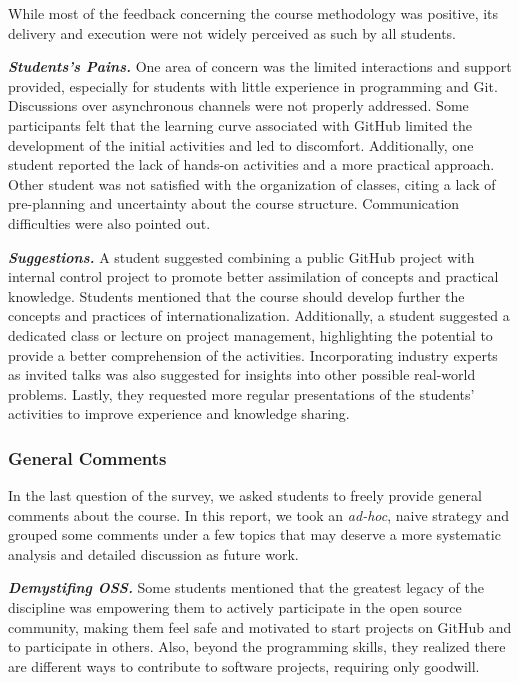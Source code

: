 \documentclass[sigconf]{acmart}
\begin{document}
While most of the feedback concerning the course methodology was positive, its delivery and execution were not widely perceived as such by all students.

\textit{\textbf{Students's Pains.}}
One area of concern was the limited interactions and support provided, especially for students with little experience in programming and Git. Discussions over asynchronous channels were not properly addressed. Some participants felt that the learning curve associated with GitHub limited the development of the initial activities and led to discomfort. Additionally, one student reported the lack of hands-on activities and a more practical approach. Other student was not satisfied with the organization of classes, citing a lack of pre-planning and uncertainty about the course structure. Communication difficulties were also pointed out.


\textit{\textbf{Suggestions.}}
A student suggested combining a public GitHub project with internal control project to promote better assimilation of concepts and practical knowledge. Students mentioned that the course should develop further the concepts and practices of internationalization. Additionally, a student suggested a dedicated class or lecture on project management, highlighting the potential to provide a better comprehension of the activities. Incorporating industry experts as invited talks was also suggested for insights into other possible real-world problems. Lastly, they requested more regular presentations of the students' activities to improve experience and knowledge sharing.

\subsubsection{General Comments}

In the last question of the survey, we asked students to freely provide general comments about the course. In this report, we took an \textit{ad-hoc}, naive strategy and  grouped some comments under a few  topics that may deserve a more systematic analysis and detailed discussion as future work.


\textit{\textbf{Demystifing OSS.}}
Some students mentioned that the greatest legacy of the discipline was empowering them to actively participate in the open source community, making them feel safe and motivated to start projects on GitHub and to participate in others. Also, beyond the programming skills, they realized there are different ways to contribute to software projects, requiring only goodwill.
\end{document}
